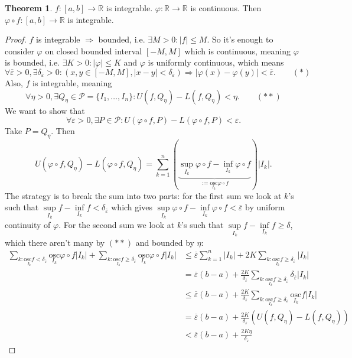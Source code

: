\documentclass[a4paper]{article}
\newcommand{\osc}{\text{osc}}
\theoremstyle{definition}
\newtheorem{thm}[defn]{Theorem}
\begin{document}
\begin{thm}
	$f:[a,b]\rightarrow \mathbb R$ is integrable. $\varphi: \mathbb R \rightarrow \mathbb R$ is continuous. Then $\varphi \circ f:[a,b]\rightarrow \mathbb R$ is integrable.
\end{thm}
\begin{proof}
	$f$ is integrable $\Rightarrow$ bounded, i.e. $\exists M>0:|f| \leq M$. So it's enough to consider $\varphi$ on closed bounded interval $[-M,M]$ which is continuous, meaning $\varphi$ is bounded, i.e. $\exists K>0:|\varphi|\leq K$ and $\varphi$ is uniformly continuous, which means
\[
\forall \overline\varepsilon >0, \exists \delta_{\overline\varepsilon} >0 : (x,y\in[-M,M],|x-y|<\delta_{\overline\varepsilon}) \Rightarrow |\varphi(x)-\varphi(y)|<\overline\varepsilon . \qquad (\ast)
\]
Also, $f$ is integrable, meaning
\[
\forall \eta >0, \exists Q_\eta \in \mathcal P=\{I_1,\ldots,I_n\} : U(f,Q_\eta)-L(f,Q_\eta) < \eta . \qquad (\ast\ast)
\]
We want to show that
\[
\forall \varepsilon >0, \exists P \in \mathcal P : U(\varphi \circ f, P)-L(\varphi \circ f,P) < \varepsilon .
\]
Take $P=Q_\eta$. Then
\[
U(\varphi \circ f, Q_\eta)-L(\varphi \circ f,Q_\eta) = \sum_{k=1}^{n} \left(\underbrace{ \underset{I_k}{\sup} \varphi \circ f - \underset{I_k}{\inf} \varphi \circ f}_{:=\underset{I_k}{\osc} \varphi \circ f} \right) \left|I_k\right| .
\]
The strategy is to break the sum into two parts: for the first sum we look at $k$'s such that $\underset{I_k}{\sup} f - \underset{I_k}{\inf} f < \delta_{\overline{\varepsilon}}$ which gives $\underset{I_k}{\sup} \varphi \circ f - \underset{I_k}{\inf} \varphi \circ f < \overline{\varepsilon}$ by uniform continuity of $\varphi$. For the second sum we look at $k$'s such that $\underset{I_k}{\sup} f - \underset{I_k}{\inf} f \geq \delta$, which there aren't many by $(\ast\ast)$ and bounded by $\eta$:
\[
\begin{aligned}\sum_{k:\underset{I_k}{\osc f}<\delta_{\overline{\varepsilon}}} \underset{I_k}{\osc} \varphi \circ f |I_k|+\sum_{k:\underset{I_k}{\osc f}\geq \delta_{\overline{\varepsilon}}} \underset{I_k}{\osc} \varphi \circ f |I_k| &\leq \overline{\varepsilon} \sum_{k=1}^n |I_k| +2K \sum_{k:\underset{I_k}{\osc f}\geq \delta_{\overline{\varepsilon}}} |I_k| \\ &=\overline{\varepsilon}(b-a) +\frac{2K}{\delta_{\overline{\varepsilon}}} \sum_{k:\underset{I_k}{\osc f}\geq \delta_{\overline{\varepsilon}}}\delta_{\overline{\varepsilon}} |I_k| \\ &\leq \overline{\varepsilon}(b-a) +\frac{2K}{\delta_{\overline{\varepsilon}}} \sum_{k:\underset{I_k}{\osc f}\geq \delta_{\overline{\varepsilon}}} \underset{I_k}{\osc} f |I_k| \\ &= \overline{\varepsilon}(b-a) +\frac{2K}{\delta_{\overline{\varepsilon}}}  \left(U(f,Q_\eta)-L(f,Q_\eta)\right) \\ &< \overline{\varepsilon}(b-a)+ \frac{2K \eta}{\delta_{\overline{\varepsilon}}} \end{aligned}
\]
\end{proof}
\end{document}

